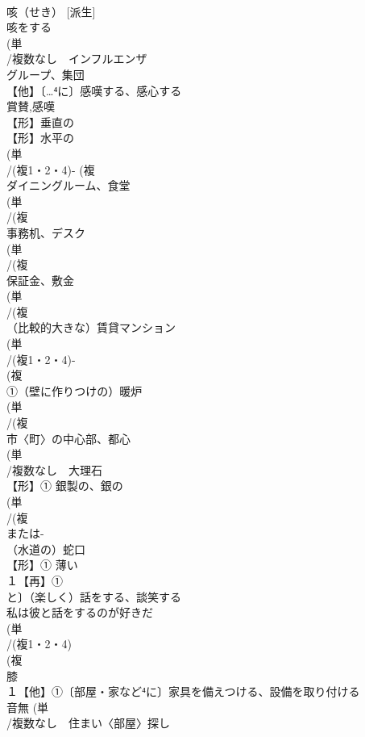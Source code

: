 \documentclass[8pt]{extreport}
\begin{document}
\begin{CJK}{UTF8}{min}
\\	咳（せき） [派生] 
\\	咳をする
\\	(単
\\	/複数なし　インフルエンザ 
\\	グループ、集団
\\	【他】〔…⁴に〕感嘆する、感心する 
\\	賞賛,感嘆
\\	【形】垂直の 
\\	【形】水平の 
\\	(単
\\	/(複1・2・4)- (複
\\	ダイニングルーム、食堂 
\\	(単
\\	/(複
\\	事務机、デスク 
\\	(単
\\	/(複
\\	保証金、敷金 
\\	(単
\\	/(複
\\	（比較的大きな）賃貸マンション 
\\	(単
\\	/(複1・2・4)-
\\	(複
\\	①（壁に作りつけの）暖炉 
\\	(単
\\	/(複
\\	市〈町〉の中心部、都心 
\\	(単
\\	/複数なし　大理石 
\\	【形】① 銀製の、銀の 
\\	(単
\\	/(複
\\	または-
\\	（水道の）蛇口 
\\	【形】① 薄い 
\\	１【再】①
\\	と〕（楽しく）話をする、談笑する 
\\	私は彼と話をするのが好きだ 
\\	(単
\\	/(複1・2・4)
\\	(複
\\	膝 
\\	１【他】①〔部屋・家など⁴に〕家具を備えつける、設備を取り付ける
\\	音無	(単
\\	/複数なし　住まい〈部屋〉探し 

\end{CJK}
\end{document}
